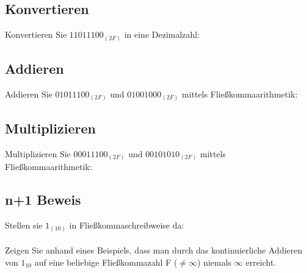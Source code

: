 \subsection{Konvertieren}
Konvertieren Sie $11011100_{(2F)}$ in eine Dezimalzahl:\\
\subsection{Addieren}
Addieren Sie $01011100_{(2F)}$ und $01001000_{(2F)}$ mittels Fließkommaarithmetik:\\
\subsection{Multiplizieren}
Multiplizieren Sie $00011100_{(2F)}$ und $00101010_{(2F)}$ mittels Fließkommaarithmetik:\\
\subsection{n+1 Beweis}
Stellen sie $1_{(10)}$ in Fließkommaschreibweise da:\\
\\[0.3cm]
Zeigen Sie anhand eines Beispiels, dass man durch das kontinuierliche Addieren von $1_{10}$ auf eine beliebige Fließkommazahl F ($\neq \infty$) niemals $\infty$ erreicht.\\
